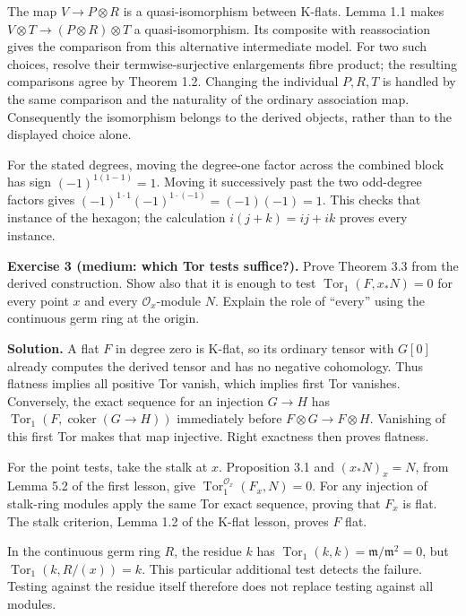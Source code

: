 \documentclass[
  english,
  11pt,
  a4paper,
]{article}
\begin{document}
The map \(V\to P\otimes R\) is a quasi-isomorphism between K-flats.
Lemma 1.1 makes \(V\otimes T\to(P\otimes R)\otimes T\) a
quasi-isomorphism. Its composite with reassociation gives the comparison
from this alternative intermediate model. For two such choices, resolve
their termwise-surjective enlargements\textquotesingle{} fibre product;
the resulting comparisons agree by Theorem 1.2. Changing the individual
\(P,R,T\) is handled by the same comparison and the naturality of the
ordinary association map. Consequently the isomorphism belongs to the
derived objects, rather than to the displayed choice alone.

For the stated degrees, moving the degree-one factor across the combined
block has sign \((-1)^{1(1-1)}=1\). Moving it successively past the two
odd-degree factors gives \((-1)^{1\cdot1}(-1)^{1\cdot(-1)}=(-1)(-1)=1\).
This checks that instance of the hexagon; the calculation
\(i(j+k)=ij+ik\) proves every instance.

\textbf{Exercise 3 (medium: which Tor tests suffice?).} Prove Theorem
3.3 from the derived construction. Show also that it is enough to test
\(\operatorname{Tor}_1(F,x_*N)=0\) for every point \(x\) and every
\(\mathcal O_x\)-module \(N\). Explain the role of ``every'' using the
continuous germ ring at the origin.

\textbf{Solution.} A flat \(F\) in degree zero is K-flat, so its
ordinary tensor with \(G[0]\) already computes the derived tensor and
has no negative cohomology. Thus flatness implies all positive Tor
vanish, which implies first Tor vanishes. Conversely, the exact sequence
for an injection \(G\to H\) has
\(\operatorname{Tor}_1(F,\operatorname{coker}(G\to H))\) immediately
before \(F\otimes G\to F\otimes H\). Vanishing of this first Tor makes
that map injective. Right exactness then proves flatness.

For the point tests, take the stalk at \(x\). Proposition 3.1 and
\((x_*N)_x=N\), from Lemma 5.2 of the first lesson, give
\(\operatorname{Tor}_1^{\mathcal O_x}(F_x,N)=0\). For any injection of
stalk-ring modules apply the same Tor exact sequence, proving that
\(F_x\) is flat. The stalk criterion, Lemma 1.2 of the K-flat lesson,
proves \(F\) flat.

In the continuous germ ring \(R\), the residue \(k\) has
\(\operatorname{Tor}_1(k,k)=\mathfrak m/\mathfrak m^2=0\), but
\(\operatorname{Tor}_1(k,R/(x))=k\). This particular additional test
detects the failure. Testing against the residue itself therefore does
not replace testing against all modules.
\end{document}
